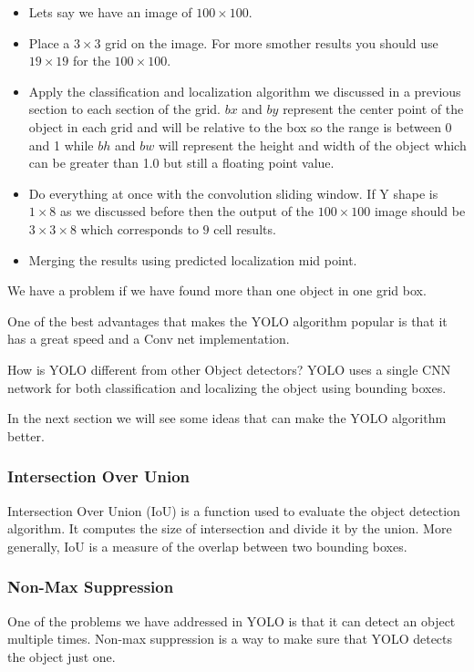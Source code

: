 \begin{itemize}
    \item Lets say we have an image of $100\times 100$.
    \item Place a $3\times 3$ grid on the image. For more smother results you should use $19\times 19$ for the $100\times100$.
    \item Apply the classification and localization algorithm we discussed in a previous section to each section of the grid. $bx$ and $by$ represent the center point of the object in each grid and will be relative to the box so the range is between 0 and 1 while $bh$ and $bw$ will represent the height and width of the object which can be greater than 1.0 but still a floating point value.
    \item Do everything at once with the convolution sliding window. If Y shape is $1\times8$ as we discussed before then the output of the $100\times 100$ image should be $3\times 3\times 8$ which corresponds to $9$ cell results.
    \item Merging the results using predicted localization mid point.
\end{itemize}

We have a problem if we have found more than one object in one grid box.

One of the best advantages that makes the YOLO algorithm popular is that it has a great speed and a Conv net implementation.

How is YOLO different from other Object detectors? YOLO uses a single CNN network for both classification and localizing the object using bounding boxes.

In the next section we will see some ideas that can make the YOLO algorithm better.

\subsubsection{Intersection Over Union}
Intersection Over Union (IoU) is a function used to evaluate the object detection algorithm. It computes the size of intersection and divide it by the union. More generally, IoU is a measure of the overlap between two bounding boxes.

\subsubsection{Non-Max Suppression}
One of the problems we have addressed in YOLO is that it can detect an object multiple times. Non-max suppression is a way to make sure that YOLO detects the object just one.

